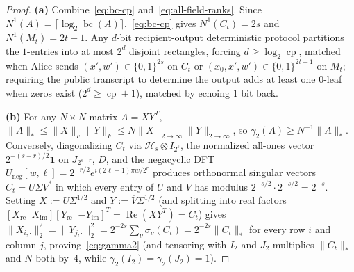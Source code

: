 \documentclass[11pt,reqno]{amsart}
\theoremstyle{definition}
\theoremstyle{remark}
\DeclareMathOperator{\bc}{bc}
\DeclareMathOperator{\cp}{cp}
\newcommand{\ind}{\mathbf{1}}
\numberwithin{equation}{section}
\begin{document}
\begin{proof}
\textbf{(a)} Combine~\eqref{eq:bc-cp} and~\eqref{eq:all-field-ranks}. Since $N^1(A) = \lceil \log_2 \bc(A) \rceil$,~\eqref{eq:bc-cp} gives $N^1(C_t) = 2s$ and $N^1(M_t) = 2t - 1$. Any $d$-bit recipient-output deterministic protocol partitions the $1$-entries into at most $2^d$ disjoint rectangles, forcing $d \ge \log_2 \cp$, matched when Alice sends $(x', w') \in \{0, 1\}^{2s}$ on $C_t$ or $(x_0, x', w') \in \{0, 1\}^{2t-1}$ on $M_t$; requiring the public transcript to determine the output adds at least one $0$-leaf when zeros exist ($2^d \ge \cp + 1$), matched by echoing $1$ bit back.

\medskip
\noindent\textbf{(b)} For any $N \times N$ matrix $A = X Y^T$, $\|A\|_* \le \|X\|_F\|Y\|_F \le N \|X\|_{2 \to \infty}\|Y\|_{2 \to \infty}$, so $\gamma_2(A) \ge N^{-1}\|A\|_*$. Conversely, diagonalizing $C_t$ via $\mathcal{H}_s \otimes I_{2^s}$, the normalized all-ones vector $2^{-(s-r)/2}\ind$ on $J_{2^{s-r}}$, $D$, and the negacyclic DFT $U_{\mathrm{neg}}[w, \ell] = 2^{-r/2} e^{i(2\ell+1)\pi w / 2^r}$ produces orthonormal singular vectors $C_t = U \Sigma V^*$ in which every entry of $U$ and $V$ has modulus $2^{-s/2} \cdot 2^{-s/2} = 2^{-s}$. Setting $X := U \Sigma^{1/2}$ and $Y := \overline{V} \Sigma^{1/2}$ (and splitting into real factors $[X_{\mathrm{re}}\;\; X_{\mathrm{im}}][Y_{\mathrm{re}}\;\; {-Y_{\mathrm{im}}}]^T = \operatorname{Re}(X Y^T) = C_t$) gives $\|X_{i,\cdot}\|_2^2 = \|Y_{j,\cdot}\|_2^2 = 2^{-2s}\sum_\nu \sigma_\nu(C_t) = 2^{-2s}\|C_t\|_*$ for every row $i$ and column $j$, proving~\eqref{eq:gamma2} (and tensoring with $I_2$ and $J_2$ multiplies $\|C_t\|_*$ and $N$ both by~$4$, while $\gamma_2(I_2) = \gamma_2(J_2) = 1$).


\end{proof}
\end{document}

